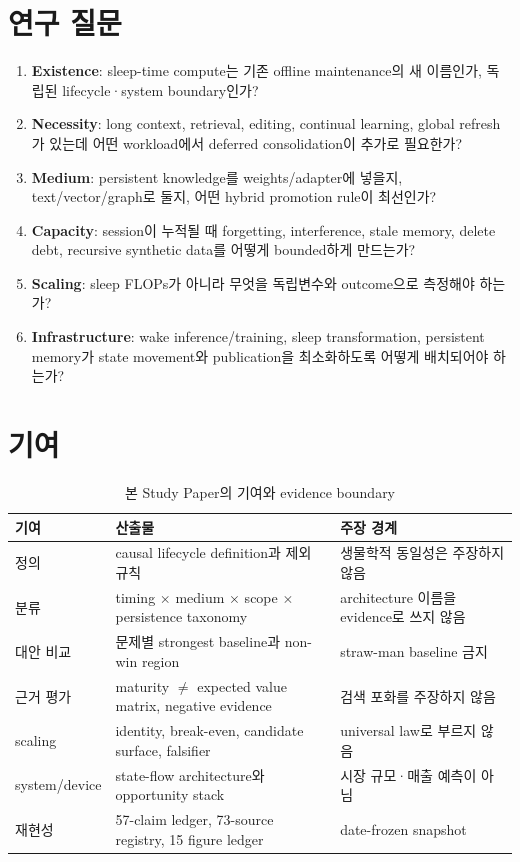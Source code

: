 \section{연구 질문}

\begin{enumerate}
  \item \textbf{Existence}: sleep-time compute는 기존 offline maintenance의 새 이름인가, 독립된
        lifecycle·system boundary인가?
  \item \textbf{Necessity}: long context, retrieval, editing, continual learning, global refresh가 있는데
        어떤 workload에서 deferred consolidation이 추가로 필요한가?
  \item \textbf{Medium}: persistent knowledge를 weights/adapter에 넣을지, text/vector/graph로 둘지,
        어떤 hybrid promotion rule이 최선인가?
  \item \textbf{Capacity}: session이 누적될 때 forgetting, interference, stale memory, delete debt,
        recursive synthetic data를 어떻게 bounded하게 만드는가?
  \item \textbf{Scaling}: sleep FLOPs가 아니라 무엇을 독립변수와 outcome으로 측정해야 하는가?
  \item \textbf{Infrastructure}: wake inference/training, sleep transformation, persistent memory가
        state movement와 publication을 최소화하도록 어떻게 배치되어야 하는가?
\end{enumerate}

\section{기여}

\begin{table}[htbp]
\centering
\caption{본 Study Paper의 기여와 evidence boundary}
\label{tab:study-contributions}
\small
\begin{tabularx}{\textwidth}{p{} X X}
\toprule
기여 & 산출물 & 주장 경계 \\
\midrule
정의 & causal lifecycle definition과 제외 규칙 & 생물학적 동일성은 주장하지 않음 \\
분류 & timing $\times$ medium $\times$ scope $\times$ persistence taxonomy & architecture 이름을 evidence로 쓰지 않음 \\
대안 비교 & 문제별 strongest baseline과 non-win region & straw-man baseline 금지 \\
근거 평가 & maturity $\neq$ expected value matrix, negative evidence & 검색 포화를 주장하지 않음 \\
scaling & identity, break-even, candidate surface, falsifier & universal law로 부르지 않음 \\
system/device & state-flow architecture와 opportunity stack & 시장 규모·매출 예측이 아님 \\
재현성 & 57-claim ledger, 73-source registry, 15 figure ledger & date-frozen snapshot \\
\bottomrule
\end{tabularx}
\end{table}

